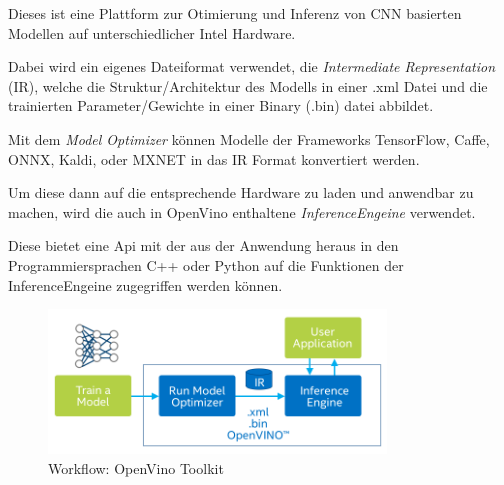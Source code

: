Dieses ist eine Plattform zur Otimierung und Inferenz von 
CNN basierten Modellen auf unterschiedlicher Intel Hardware.

Dabei wird ein eigenes Dateiformat verwendet, die \textit{Intermediate 
Representation} (IR), welche die Struktur/Architektur des Modells 
in einer .xml Datei und die trainierten Parameter/Gewichte in 
einer Binary (.bin) datei abbildet.

Mit dem \textit{Model Optimizer} können Modelle der Frameworks 
TensorFlow, Caffe, ONNX, Kaldi, oder MXNET in das IR Format 
konvertiert werden.

Um diese dann auf die entsprechende Hardware zu laden und anwendbar 
zu machen, wird die auch in OpenVino enthaltene
\textit{InferenceEngeine} verwendet.

Diese bietet eine Api mit der aus der Anwendung heraus in den 
Programmiersprachen C++ oder Python auf die Funktionen der 
InferenceEngeine zugegriffen werden können.

\begin{figure}[htb]
    \centering
    \includegraphics[width=0.8\textwidth]{./Bilder/open_vino_workflow_steps.png}
    \caption{Workflow: OpenVino Toolkit}
    \label{img:openvinoworkflow}
\end{figure}
